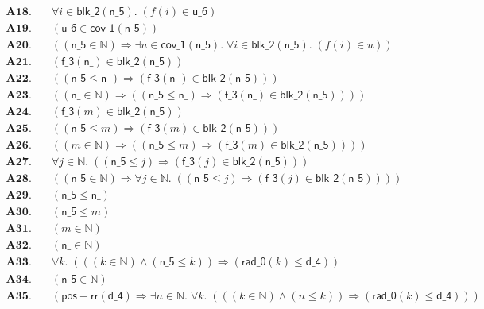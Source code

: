 \documentclass[11pt]{article}
\begin{document}
\begin{align*}
  \mathbf{A18.}\quad & \forall i \in \mathsf{blk\_2}(\mathsf{n\_5}).\; (f(i) \in \mathsf{u\_6}) \\
  \mathbf{A19.}\quad & (\mathsf{u\_6} \in \mathsf{cov\_1}(\mathsf{n\_5})) \\
  \mathbf{A20.}\quad & ((\mathsf{n\_5} \in \mathbb{N}) \Rightarrow \exists u \in \mathsf{cov\_1}(\mathsf{n\_5}).\; \forall i \in \mathsf{blk\_2}(\mathsf{n\_5}).\; (f(i) \in u)) \\
  \mathbf{A21.}\quad & (\mathsf{f\_3}(\mathsf{n\_}) \in \mathsf{blk\_2}(\mathsf{n\_5})) \\
  \mathbf{A22.}\quad & ((\mathsf{n\_5} \leq \mathsf{n\_}) \Rightarrow (\mathsf{f\_3}(\mathsf{n\_}) \in \mathsf{blk\_2}(\mathsf{n\_5}))) \\
  \mathbf{A23.}\quad & ((\mathsf{n\_} \in \mathbb{N}) \Rightarrow ((\mathsf{n\_5} \leq \mathsf{n\_}) \Rightarrow (\mathsf{f\_3}(\mathsf{n\_}) \in \mathsf{blk\_2}(\mathsf{n\_5})))) \\
  \mathbf{A24.}\quad & (\mathsf{f\_3}(m) \in \mathsf{blk\_2}(\mathsf{n\_5})) \\
  \mathbf{A25.}\quad & ((\mathsf{n\_5} \leq m) \Rightarrow (\mathsf{f\_3}(m) \in \mathsf{blk\_2}(\mathsf{n\_5}))) \\
  \mathbf{A26.}\quad & ((m \in \mathbb{N}) \Rightarrow ((\mathsf{n\_5} \leq m) \Rightarrow (\mathsf{f\_3}(m) \in \mathsf{blk\_2}(\mathsf{n\_5})))) \\
  \mathbf{A27.}\quad & \forall j \in \mathbb{N}.\; ((\mathsf{n\_5} \leq j) \Rightarrow (\mathsf{f\_3}(j) \in \mathsf{blk\_2}(\mathsf{n\_5}))) \\
  \mathbf{A28.}\quad & ((\mathsf{n\_5} \in \mathbb{N}) \Rightarrow \forall j \in \mathbb{N}.\; ((\mathsf{n\_5} \leq j) \Rightarrow (\mathsf{f\_3}(j) \in \mathsf{blk\_2}(\mathsf{n\_5})))) \\
  \mathbf{A29.}\quad & (\mathsf{n\_5} \leq \mathsf{n\_}) \\
  \mathbf{A30.}\quad & (\mathsf{n\_5} \leq m) \\
  \mathbf{A31.}\quad & (m \in \mathbb{N}) \\
  \mathbf{A32.}\quad & (\mathsf{n\_} \in \mathbb{N}) \\
  \mathbf{A33.}\quad & \forall k.\; (((k \in \mathbb{N}) \wedge (\mathsf{n\_5} \leq k)) \Rightarrow (\mathsf{rad\_0}(k) \leq \mathsf{d\_4})) \\
  \mathbf{A34.}\quad & (\mathsf{n\_5} \in \mathbb{N}) \\
  \mathbf{A35.}\quad & (\mathsf{pos{-}rr}(\mathsf{d\_4}) \Rightarrow \exists n \in \mathbb{N}.\; \forall k.\; (((k \in \mathbb{N}) \wedge (n \leq k)) \Rightarrow (\mathsf{rad\_0}(k) \leq \mathsf{d\_4}))) \\

\end{align*}
\end{document}
